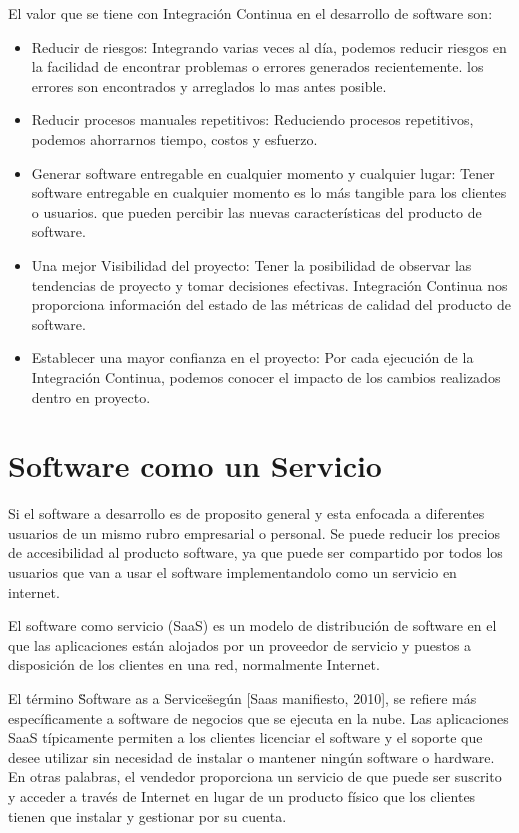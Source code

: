 \noindent El valor que se tiene con Integración Continua en el desarrollo de software son:
\begin{itemize}
\item Reducir de riesgos: Integrando varias veces al día, podemos reducir riesgos en la facilidad de encontrar problemas o errores generados recientemente. los errores son encontrados y arreglados lo mas antes posible.
\item Reducir procesos manuales repetitivos: Reduciendo procesos repetitivos, podemos ahorrarnos tiempo, costos y esfuerzo.
\item Generar software entregable en cualquier momento y cualquier lugar: Tener software entregable en cualquier momento es lo más tangible para los clientes o usuarios. que pueden percibir las nuevas características del producto de software.
\item Una mejor Visibilidad del proyecto: Tener la posibilidad de observar las tendencias de proyecto y tomar decisiones efectivas. Integración Continua nos proporciona información del estado de las métricas de calidad del producto de software.
\item Establecer una mayor confianza en el proyecto: Por cada ejecución de la Integración Continua, podemos conocer el impacto de los cambios realizados dentro en proyecto.
\end{itemize}

\section{Software como un Servicio}
\noindent Si el software a desarrollo es de proposito general y esta enfocada a diferentes usuarios de un mismo rubro empresarial o personal. Se puede reducir los precios de accesibilidad al producto software, ya que puede ser compartido por todos los usuarios que van a usar el software implementandolo como un servicio en internet.

\noindent El software como servicio (SaaS) es un modelo de distribución de software en el que las aplicaciones están alojados por un proveedor de servicio y puestos a disposición de los clientes en una red, normalmente Internet.

\noindent El término \"Software as a Service\" según [Saas manifiesto, 2010], se refiere más específicamente a software de negocios que se ejecuta en la nube. Las aplicaciones SaaS típicamente permiten a los clientes licenciar el software y el soporte que desee utilizar sin necesidad de instalar o mantener ningún software o hardware. En otras palabras, el vendedor proporciona un servicio de que puede ser suscrito y acceder a través de Internet en lugar de un producto físico que los clientes tienen que instalar y gestionar por su cuenta.

